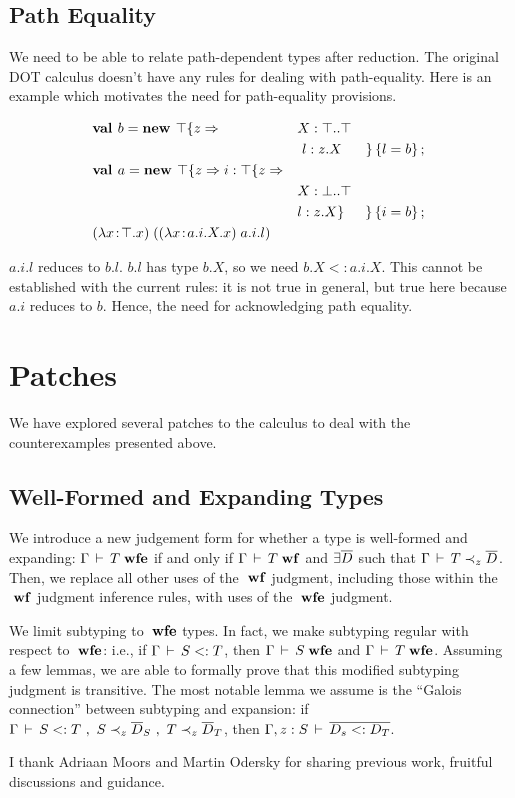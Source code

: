 \documentclass[preprint]{sigplanconf}
\begin{document}
\subsection{Path Equality}\label{patheq}

We need to be able to relate path-dependent types after reduction. The
original DOT calculus doesn't have any rules for dealing with
path-equality. Here is an example which motivates the need for
path-equality provisions.

\begin{align*}
&\textbf{val }b = \textbf{new }\top \{z \Rightarrow &&X : \top..\top&\\
&&&\ l : z.X& \}\left\{l = b\right\} ;\;\\&
\textbf{val }a = \textbf{new }\top \{z \Rightarrow i : \top \{z \Rightarrow &&&\\
&&&X : \bot..\top\\
&&&l : z.X \}& \}\left\{i = b\right\} ;\;\\&
(\lambda x\!:\!\top.x)\;((\lambda x\!:\!a.i.X.x)\;a.i.l)
\end{align*}

$a.i.l$ reduces to $b.l$. $b.l$ has type $b.X$, so we need $b.X <:
a.i.X$. This cannot be established with the current rules: it is not
true in general, but true here because $a.i$ reduces to $b$. Hence,
the need for acknowledging path equality.

\section{Patches}

We have explored several patches to the calculus to deal with the
counterexamples presented above.

\subsection{Well-Formed and Expanding Types}\label{wfe}

We introduce a new judgement form for whether a type is well-formed
and expanding: $\Gamma \,\vdash\, T \;\mbox{\textbf{wfe}}$ if and only if $\Gamma \,\vdash\, T \;\mbox{\textbf{wf}}$
and $\exists \overline{D}$ such that $\Gamma \,\vdash\, T \prec_z \overline{D}$. Then,
we replace all other uses of the $\;\mbox{\textbf{wf}}$ judgment, including those
within the $\;\mbox{\textbf{wf}}$ judgment inference rules, with uses of the $\;\mbox{\textbf{wfe}}$
judgment.

We limit subtyping to $\;\mbox{\textbf{wfe}}$ types. In fact, we make subtyping regular
with respect to $\;\mbox{\textbf{wfe}}$: i.e., if $\Gamma \,\vdash\, S <: T$, then $\Gamma \,\vdash\,
S \;\mbox{\textbf{wfe}}$ and $\Gamma \,\vdash\, T \;\mbox{\textbf{wfe}}$. Assuming a few lemmas, we are able to
formally prove that this modified subtyping judgment is
transitive. The most notable lemma we assume is the ``Galois
connection'' between subtyping and expansion: if $\Gamma \,\vdash\, S <: T
~,~ S \prec_z \overline{D}_S ~,~ T \prec_z\overline{D}_T$, then
$\Gamma , z: S \,\vdash\, \overline{D_s <: D_T}$.


\acks

I thank Adriaan Moors and Martin Odersky for sharing previous work,
fruitful discussions and guidance.

%
%
\end{document}
